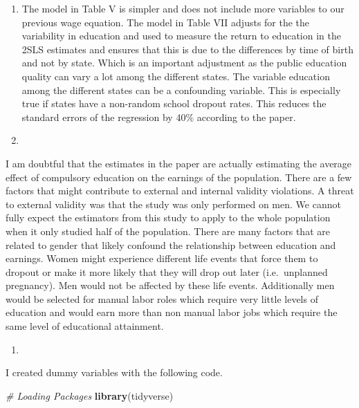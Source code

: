 \documentclass[
  12pt,
  landscape]{article}
\newenvironment{Shaded}{\begin{snugshade}}{\end{snugshade}}
\newcommand{\CommentTok}[1]{\textcolor[rgb]{0.56,0.35,0.01}{\textit{#1}}}
\newcommand{\KeywordTok}[1]{\textcolor[rgb]{0.13,0.29,0.53}{\textbf{#1}}}
\newcommand{\NormalTok}[1]{#1}
\begin{document}
\begin{enumerate}
\def\labelenumi{(\alph{enumi})}
\setcounter{enumi}{5}
\item
  The model in Table V is simpler and does not include more variables to
  our previous wage equation. The model in Table VII adjusts for the the
  variability in education and used to measure the return to education
  in the 2SLS estimates and ensures that this is due to the differences
  by time of birth and not by state. Which is an important adjustment as
  the public education quality can vary a lot among the different
  states. The variable education among the different states can be a
  confounding variable. This is especially true if states have a
  non-random school dropout rates. This reduces the standard errors of
  the regression by 40\% according to the paper.
\item
\end{enumerate}

I am doubtful that the estimates in the paper are actually estimating
the average effect of compulsory education on the earnings of the
population. There are a few factors that might contribute to external
and internal validity violations. A threat to external validity was that
the study was only performed on men. We cannot fully expect the
estimators from this study to apply to the whole population when it only
studied half of the population. There are many factors that are related
to gender that likely confound the relationship between education and
earnings. Women might experience different life events that force them
to dropout or make it more likely that they will drop out later
(i.e.~unplanned pregnancy). Men would not be affected by these life
events. Additionally men would be selected for manual labor roles which
require very little levels of education and would earn more than non
manual labor jobs which require the same level of educational
attainment.

\begin{enumerate}
\def\labelenumi{(\alph{enumi})}
\setcounter{enumi}{7}
\item
\end{enumerate}

I created dummy variables with the following code.

\begin{Shaded}
\begin{Highlighting}[]
\CommentTok{# Loading Packages}
\KeywordTok{library}\NormalTok{(tidyverse)}
\end{Highlighting}
\end{Shaded}
\end{document}

